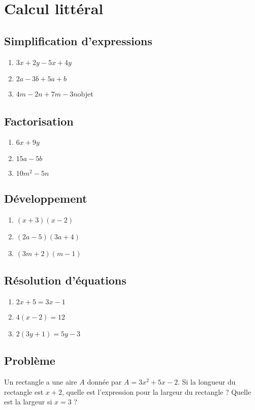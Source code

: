 \documentclass[12pt,a4paper,fleqn]{article}
\begin{document}
\pagestyle{fancy} %


\section{Calcul littéral}
\subsection{Simplification d'expressions}
\begin{enumerate}
    \item \(3x + 2y - 5x + 4y\)
    \item \(2a - 3b + 5a + b\)
    \item \(4m - 2n + 7m - 3n\)objet
\end{enumerate}
\subsection{Factorisation}
\begin{enumerate}
    \item  \(6x + 9y\)
    \item  \(15a - 5b\)
    \item  \(10m^2 - 5n\)
\end{enumerate}
\subsection{Développement}
\begin{enumerate}
    \item \((x + 3)(x - 2)\)
    \item \((2a - 5)(3a + 4)\)
    \item \((3m + 2)(m - 1)\)
\end{enumerate}
\subsection{Résolution d'équations}
\begin{enumerate}
    \item \(2x + 5 = 3x - 1\)
    \item \(4(x - 2) = 12\)
    \item \(2(3y + 1) = 5y - 3\)
\end{enumerate}
\subsection{Problème}
Un rectangle a une aire $A$ donnée par \(A = 3x^2 + 5x - 2\). Si la longueur du rectangle est \(x + 2\), quelle est l'expression pour la largeur du rectangle ? Quelle est la largeur si $x=3$ ?
\end{document}
